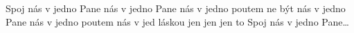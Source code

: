 \begin{TEXT}{Spoj nás v jedno Pane}
\SLOKA* {} nás v jedno Pane  nás v jedno poutem \NL
{} ne být  \NL
{} nás v jedno Pane  nás v jedno poutem \NL
{} nás v jed láskou  
\REFREN  {} jen    jen   \NL
{} jen   to     \NL
Spoj nás v jedno Pane… \NL
\end{TEXT}
